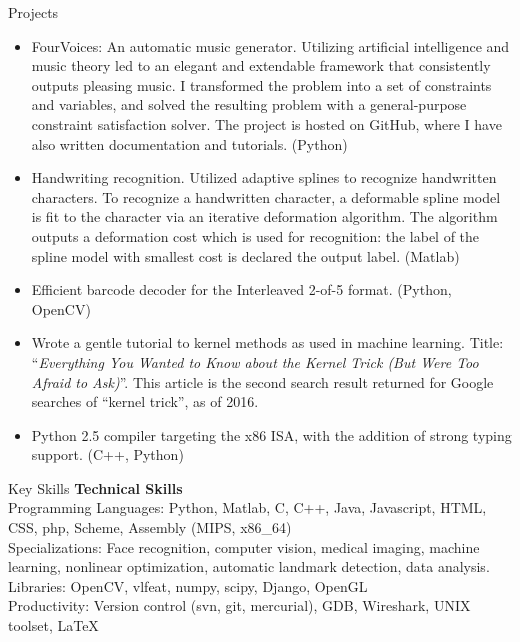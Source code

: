 \documentclass{resume}
\begin{document}
\begin{component}{Projects}
	\begin{itemize}
		\vspace{-0.5em}\item FourVoices: An automatic music generator. Utilizing artificial intelligence and music theory led to an elegant and extendable framework that consistently outputs pleasing music.
I transformed the problem into a set of constraints and variables, and solved the resulting problem with a general-purpose constraint satisfaction solver.
The project is hosted on GitHub, where I have also written documentation and tutorials.
		(Python)
        \vspace{-0.5em}\item Handwriting recognition. Utilized adaptive splines to recognize handwritten characters.
To recognize a handwritten character, a deformable spline model is fit to the character via an iterative deformation algorithm.
The algorithm outputs a deformation cost which is used for recognition: the label of the spline model with smallest cost is declared the output label.
(Matlab)
        \vspace{-0.5em}\item Efficient barcode decoder
	        for the Interleaved 2-of-5 format. (Python, OpenCV)
        \vspace{-0.5em}\item Wrote a gentle tutorial to kernel methods as used in machine learning. Title: ``\emph{Everything You Wanted to Know about the Kernel Trick (But Were Too Afraid to Ask)}''. This article is the second search result returned for Google searches of ``kernel trick'', as of 2016.
		\vspace{-0.5em}\item Python 2.5 compiler targeting the x86 ISA, with the addition of
		strong typing support. (C++, Python)
	\end{itemize}
\end{component}

\vspace{-1.0em}

\begin{component}{Key Skills}
	\textbf{Technical Skills}\\
		Programming Languages: Python, Matlab, C, C++, Java, Javascript, HTML, CSS, php, Scheme, Assembly (MIPS, x86\_64)\\
        Specializations: Face recognition, computer vision, medical imaging, machine learning, nonlinear optimization, automatic landmark detection, data analysis.\\
		Libraries: OpenCV, vlfeat, numpy, scipy, Django, OpenGL \\
		Productivity: Version control (svn, git, mercurial), GDB, Wireshark, UNIX toolset, LaTeX
\end{component}
\end{document}
